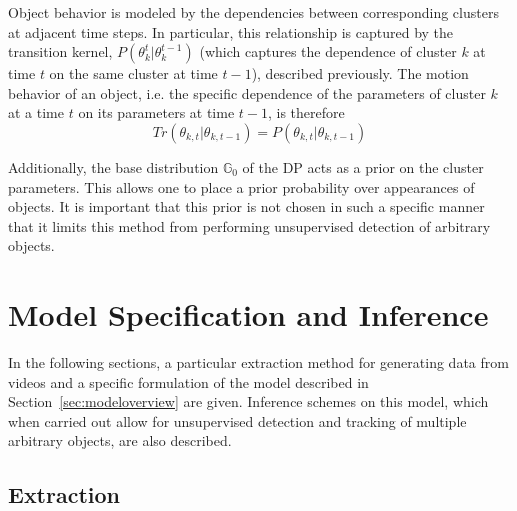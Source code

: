 \documentclass{article}
\begin{document}
Object behavior is modeled by the dependencies between corresponding clusters at adjacent time steps. In particular, this relationship is captured by the transition kernel, $P(\theta_{k}^{t} | \theta_{k}^{t-1})$ (which captures the dependence of cluster $k$ at time $t$ on the same cluster at time $t-1$), described previously. The motion behavior of an object, i.e. the specific dependence of the parameters of cluster $k$ at a time $t$ on its parameters at time $t-1$, is therefore
\begin{equation}
Tr(\theta_{k, t} | \theta_{k, t-1}) = P(\theta_{k, t} | \theta_{k, t-1})
\end{equation}

Additionally, the base distribution $\mathbb{G}_{0}$ of the DP acts as a prior on the cluster parameters. This allows one to place a prior probability over appearances of objects. It is important that this prior is not chosen in such a specific manner that it limits this method from performing unsupervised detection of arbitrary objects.









\section{Model Specification and Inference}

In the following sections, a particular extraction method for generating data from videos and a specific formulation of the model described in Section~\ref{sec:modeloverview} are given. Inference schemes on this model, which when carried out allow for unsupervised detection and tracking of multiple arbitrary objects, are also described.



\subsection{Extraction}
\label{sec:modelspec_extraction}
\end{document}
